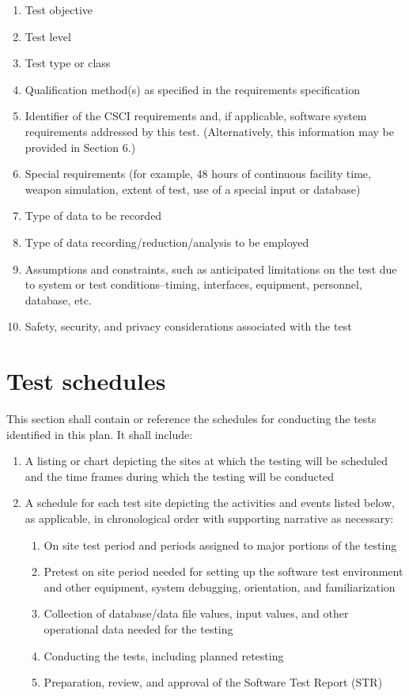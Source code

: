 \documentclass{fidata-report-template}
\begin{document}
\begin{enumerate}
\itemsep1pt\parskip0pt
\item
  Test objective
\item
  Test level
\item
  Test type or class
\item
  Qualification method(s) as specified in the requirements specification
\item
  Identifier of the CSCI requirements and, if applicable, software
  system requirements addressed by this test. (Alternatively, this
  information may be provided in Section 6.)
\item
  Special requirements (for example, 48 hours of continuous facility
  time, weapon simulation, extent of test, use of a special input or
  database)
\item
  Type of data to be recorded
\item
  Type of data recording/reduction/analysis to be employed
\item
  Assumptions and constraints, such as anticipated limitations on the
  test due to system or test conditions--timing, interfaces, equipment,
  personnel, database, etc.
\item
  Safety, security, and privacy considerations associated with the test
\end{enumerate}

\section{Test schedules}

This section shall contain or reference the schedules for conducting the
tests identified in this plan. It shall include:

\begin{enumerate}
\itemsep1pt\parskip0pt
\item
  A listing or chart depicting the sites at which the testing will be
  scheduled and the time frames during which the testing will be
  conducted
\item
  A schedule for each test site depicting the activities and events
  listed below, as applicable, in chronological order with supporting
  narrative as necessary:

  \begin{enumerate}
  \itemsep1pt\parskip0pt
  \item
    On site test period and periods assigned to major portions of the
    testing
  \item
    Pretest on site period needed for setting up the software test
    environment and other equipment, system debugging, orientation, and
    familiarization
  \item
    Collection of database/data file values, input values, and other
    operational data needed for the testing
  \item
    Conducting the tests, including planned retesting
  \item
    Preparation, review, and approval of the Software Test Report (STR)
  \end{enumerate}
\end{enumerate}
\end{document}
